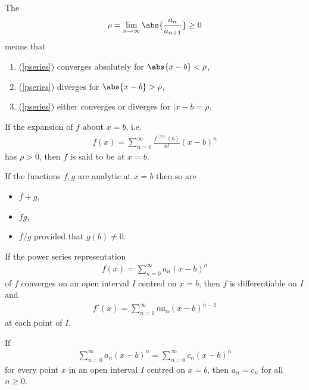 \documentclass{article}
\begin{document}
\begin{definition}
    The 
    \begin{align*}
        \rho=\lim_{n\to\infty}\abs{\frac{a_n}{a_{n+1}}}\geq 0
    \end{align*}
    means that
    \begin{enumerate}
        \item (\ref{pseries}) converges absolutely for $\abs{x-b}<\rho$,
        \item (\ref{pseries}) diverges for $\abs{x-b}>\rho$,
        \item (\ref{pseries}) either converges or diverges for $|x-b=\rho$.
    \end{enumerate}
\end{definition}
\begin{definition}
    If the  expansion of $f$ about $x=b$, i.e.
    \begin{align*}
        f(x)=\sum_{n=0}^\infty \frac{f^{(n)}(b)}{n!}(x-b)^n
    \end{align*}
    has $\rho>0$, then $f$ is said to be  at $x=b$.
\end{definition}
\begin{lemma}
    If the functions $f,g$ are analytic at $x=b$ then so are
    \begin{itemize}
        \item $f+g$,
        \item $fg$,
        \item $f/g$ provided that $g(b)\not=0$.
    \end{itemize}
\end{lemma}
\begin{theorem}
    If the power series representation
    \begin{align*}
        f(x)=\sum_{n=0}^\infty a_n(x-b)^n
    \end{align*}
    of $f$ converges on an open interval $I$ centred on $x=b$, then $f$
    is differentiable on $I$ and
    \begin{align*}
        f'(x)=\sum_{n=1}^\infty na_n(x-b)^{n-1}
    \end{align*}
    at each point of $I$.
\end{theorem}
\begin{theorem}
    If
    \begin{align*}
        \sum_{n=0}^\infty a_n(x-b)^n = \sum_{n=0}^\infty c_n(x-b)^n
    \end{align*} 
    for every point $x$ in an open interval $I$ centred on $x=b$, then $a_n=c_n$
    for all $n\geq 0$.
\end{theorem}
\end{document}
